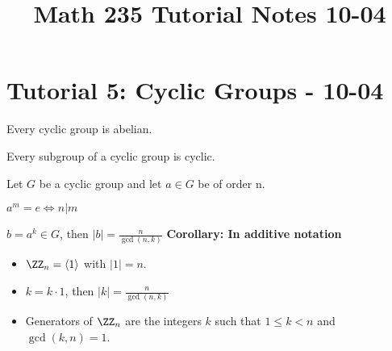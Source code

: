 \documentclass[class=scrartcl, crop=false]{standalone}
\title{Math 235 Tutorial Notes 10-04}
\begin{document}
\section{Tutorial 5: Cyclic Groups - 10-04}

\begin{theorem}
  Every cyclic group is abelian.
\end{theorem}
\begin{theorem}
  Every subgroup of a cyclic group is cyclic.
\end{theorem}
Let $G$ be a cyclic group and let $a \in G$ be of order n.
\begin{theorem}
  $a^m = e \Leftrightarrow n | m$
\end{theorem}
\begin{theorem}
  $b = a^k \in G$, then $|b| = \frac{n}{\gcd(n, k)}$ \newline
  \textbf{Corollary: In additive notation}

  \begin{itemize}
    \item
      $\ZZ_n = \langle 1 \rangle$ with $|1| = n$.

    \item
      $k = k \cdot 1$, then $|k| = \frac{n}{\gcd(n, k)}$

    \item
      Generators of $\ZZ_n$ are the integers $k$ such that $1 \leq k < n$ and $\gcd(k, n) = 1$.

  \end{itemize}
 \end{theorem}
\end{document}
